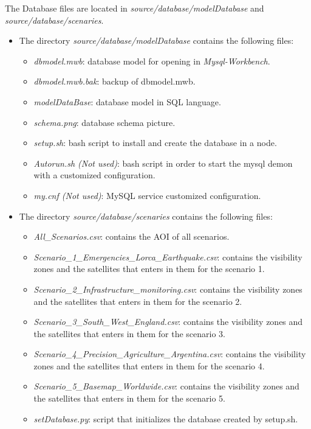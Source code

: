 The Database files are located in \emph{source/database/modelDatabase} and
\emph{source/database/scenaries}.
\begin{itemize}
\item	The directory \emph{source/database/modelDatabase} contains the
  following files:
\begin{itemize}
\item \emph{dbmodel.mwb}: database model for opening in \emph{Mysql-Workbench}. 
\item \emph{dbmodel.mwb.bak}: backup of dbmodel.mwb.
\item \emph{modelDataBase}: database model in SQL language.
\item \emph{schema.png}: database schema picture.
\item \emph{setup.sh}: bash script to install and create the database in a \bonfire node.
\item \emph{Autorun.sh (Not used)}: bash script in order to start the mysql demon with a customized configuration.
\item \emph{my.cnf (Not used)}: MySQL service  customized configuration.
\end{itemize}
\item The directory \emph{source/database/scenaries} contains the following files:
\begin{itemize}
\item \emph{All\_Scenarios.csv}: contains the \ac{AOI} of all scenarios.
\item \emph{Scenario\_1\_Emergencies\_Lorca\_Earthquake.csv}: contains the visibility zones and the satellites that enters in them for the scenario 1.
\item \emph{Scenario\_2\_Infrastructure\_monitoring.csv}: contains the visibility zones and the satellites that enters in them for the scenario 2.
\item \emph{Scenario\_3\_South\_West\_England.csv}: contains the visibility zones and the satellites that enters in them for the scenario 3.
\item \emph{Scenario\_4\_Precision\_Agriculture\_Argentina.csv}: contains the visibility zones and the satellites that enters in them for the scenario 4.
\item \emph{Scenario\_5\_Basemap\_Worldwide.csv}: contains the visibility zones and the satellites that enters in them for the scenario 5.
\item \emph{setDatabase.py}: script that initializes the database created by
setup.sh.
\end{itemize}
\end{itemize}
